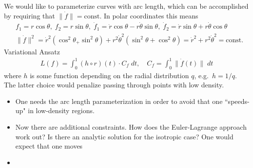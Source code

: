 \documentclass{article}
\begin{document}
We would like to parameterize curves with arc length, which can be accomplished by requiring that $\| \dot f\|=\text{const}$. In polar coordinates this means 
\begin{align}
& f_1 = r \cos \theta, \; f_2 = r \sin \theta, \; 
\dot f_1 = \dot r \cos \theta - r \dot \theta  \sin \theta, \; \dot f_2 = \dot r \sin \theta + r  \dot \theta \cos \theta\\
& \| \dot f\|^2 = \dot r^2 (\cos^2 \theta _+ \sin^2 \theta) + r^2 \dot \theta^2  (\sin^2 \theta + \cos^2 \theta) = \dot r^2 + r^2 \dot \theta^2 = \text{const.}
\end{align}
Variational Ansatz
\begin{align}
L(f) = \int_0^1 (h \circ r)(t) \cdot C_f \; dt, \quad C_f = \int_0^1 \| \dot f(t)\| \; dt
\end{align}
where $h$ is some function depending on the radial distribution $q$, e.g.~$h = 1/q$. The latter choice would penalize passing through points with low density. 

\begin{itemize}
\item One needs the arc length parameterization in order to avoid that one ``speeds-up" in low-density regions.
\item Now there are additional constraints. How does the Euler-Lagrange approach work out?  Is there an analytic solution for the isotropic case? One would expect that one moves 
\item 
\end{itemize}
\end{document}

